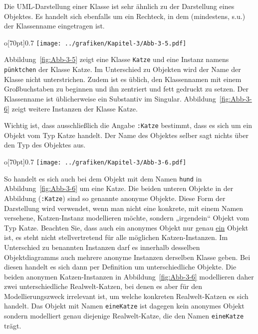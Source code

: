 Die UML-Darstellung einer Klasse ist sehr ähnlich zu der Darstellung eines Objektes. Es handelt sich ebenfalls um ein Rechteck, in dem (mindestens, s.u.) der Klassenname eingetragen ist.
\begin{wrapfigure}{o}[70pt]{0.7\textwidth}
	\centering 
	\texttt{[image: ../grafiken/Kapitel-3/Abb-3-5.pdf]}
	\caption{Eine Klasse mit Namen \texttt{Katze} (links) und eine Instanz dieser Klasse mit Namen \texttt{pünktchen} (rechts)}
	\label{fig:Abb-3-5}
	\vspace{-6pt}
\end{wrapfigure}
Abbildung~\ref{fig:Abb-3-5} zeigt eine Klasse \texttt{Katze} und eine Instanz namens \texttt{pünktchen} der Klasse Katze. Im Unterschied zu Objekten wird der Name der Klasse nicht unterstrichen. Zudem ist es üblich, den Klassennamen mit einem Großbuchstaben zu beginnen und ihn zentriert und fett gedruckt zu setzen. Der Klassenname ist üblicherweise ein Substantiv im Singular. Abbildung~\ref{fig:Abb-3-6} zeigt weitere Instanzen der Klasse Katze.

Wichtig ist, dass ausschließlich die Angabe \texttt{:Katze} bestimmt, dass es sich um ein Objekt vom Typ Katze handelt. Der Name des Objektes selber sagt nichts über den Typ des Objektes aus. 
\begin{wrapfigure}{o}[70pt]{0.7\textwidth}
	\centering 
	\texttt{[image: ../grafiken/Kapitel-3/Abb-3-6.pdf]}
	\caption{sechs verschiedene Instanzen der Klasse Katze}
	\label{fig:Abb-3-6}
	\vspace{-6pt}
\end{wrapfigure}
So handelt es sich auch bei dem Objekt mit dem Namen \texttt{hund} in Abbildung~\ref{fig:Abb-3-6} um eine Katze. Die beiden unteren Objekte in der Abbildung (\texttt{:Katze}) sind so genannte anonyme Objekte. Diese Form der Darstellung wird verwendet, wenn man nicht eine konkrete, mit einem Namen versehene, Katzen-Instanz modellieren möchte, sondern „irgendein“ Objekt vom Typ Katze. Beachten Sie, dass auch ein anonymes Objekt nur genau \underline{ein} Objekt ist, es steht nicht stellvertretend für alle möglichen Katzen-Instanzen. Im Unterschied zu benannten Instanzen darf es innerhalb desselben Objektdiagramms auch mehrere anonyme Instanzen derselben Klasse geben. Bei diesen handelt es sich dann per Definition um unterschiedliche Objekte. Die beiden anonymen Katzen-Instanzen in Abbildung~\ref{fig:Abb-3-6} modellieren daher zwei unterschiedliche Realwelt-Katzen, bei denen es aber für den Modellierungszweck irrelevant ist, um welche konkreten Realwelt-Katzen es sich handelt. Das Objekt mit Namen \texttt{eineKatze} ist dagegen kein anonymes Objekt sondern modelliert genau diejenige Realwelt-Katze, die den Namen \texttt{eineKatze} trägt.